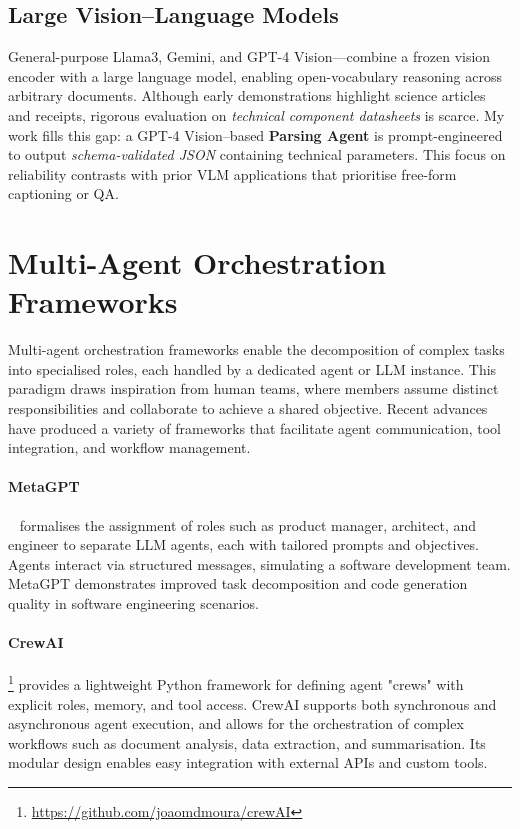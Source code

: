 \subsection{Large Vision--Language Models}
General-purpose Llama3, Gemini, and GPT-4 Vision—combine a frozen vision
encoder with a large language model, enabling open-vocabulary reasoning across
arbitrary documents.
Although early demonstrations highlight science articles and receipts,
rigorous evaluation on \emph{technical component datasheets} is scarce.
My work fills this gap: a GPT-4 Vision–based \textbf{Parsing Agent} is
prompt-engineered to output \emph{schema-validated JSON} containing technical parameters.
This focus on reliability contrasts with prior VLM
applications that prioritise free-form captioning or QA.

\section{Multi-Agent Orchestration Frameworks}
Multi-agent orchestration frameworks enable the decomposition of complex tasks into specialised roles, each handled by a dedicated agent or LLM instance. This paradigm draws inspiration from human teams, where members assume distinct responsibilities and collaborate to achieve a shared objective. Recent advances have produced a variety of frameworks that facilitate agent communication, tool integration, and workflow management.

\paragraph{MetaGPT}~\cite{hong2023metagpt} formalises the assignment of roles such as product manager, architect, and engineer to separate LLM agents, each with tailored prompts and objectives. Agents interact via structured messages, simulating a software development team. MetaGPT demonstrates improved task decomposition and code generation quality in software engineering scenarios.

\paragraph{CrewAI}\footnote{\url{https://github.com/joaomdmoura/crewAI}} provides a lightweight Python framework for defining agent "crews" with explicit roles, memory, and tool access. CrewAI supports both synchronous and asynchronous agent execution, and allows for the orchestration of complex workflows such as document analysis, data extraction, and summarisation. Its modular design enables easy integration with external APIs and custom tools.

